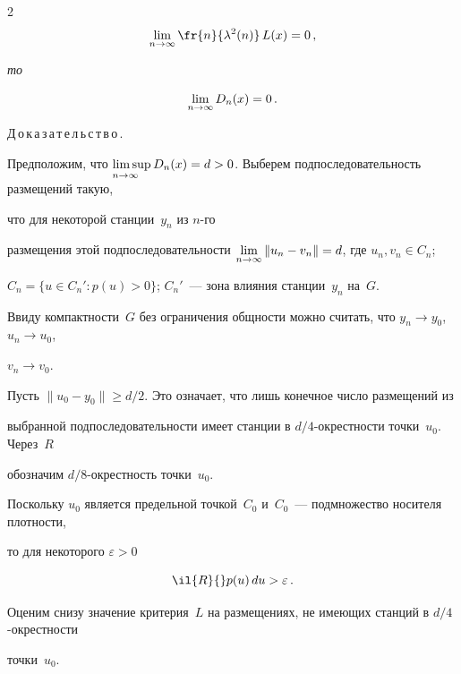 \begin{multicols}{2}
$$


\liml{n\rightarrow\infty} \fr{n}{\lambda^2(n)}\,L(x)=0\,,


$$ 


\textit{то}


$$


\liml{n\rightarrow\infty} D_n(x)=0\,.


$$





\smallskip





\noindent


Д\,о\,к\,а\,з\,а\,т\,е\,л\,ь\,с\,т\,в\,о\,.\ 


Предположим, что $\limsup\limits_{n \to \infty~~~} D_n(x)=d>0$. Выберем подпоследовательность размещений такую, 


что для некоторой станции~$y_n$ из $n$-го


размещения этой подпоследовательности $\lim\limits_{n\to\infty} \|u_n-v_n\|=d$, где $u_n, v_n \in C_n$;


$C_n=\{u\in C_n' : p(u)>0 \}$; $C_n'$~--- зона влияния станции~$y_n$ на~$G$.





Ввиду компактности~$G$ без ограничения общ\-ности можно считать, что $y_n \to y_0$, $u_n \to u_0$,


$v_n \to v_0 $.





Пусть $\|u_0 - y_0\|\geqslant d/2$. Это означает, что лишь конечное число размещений из


выбранной подпоследовательности имеет станции в $d/4$-окрестности точки~$u_0$. Через~$R$


обозначим $d/8$-окрестность точки~$u_0$.


%


Поскольку $u_0$ является предельной точкой~$C_0$ и~$C_0$~--- подмножество носителя плотности,


то для некоторого $\varepsilon>0$ 


$$


\il{R}{}p(u)\,du > \varepsilon\,.


$$





Оценим снизу значение критерия~$L$ на размещениях, не имеющих станций в $d/4$-окрест\-ности


точки~$u_0$.



\end{multicols}
